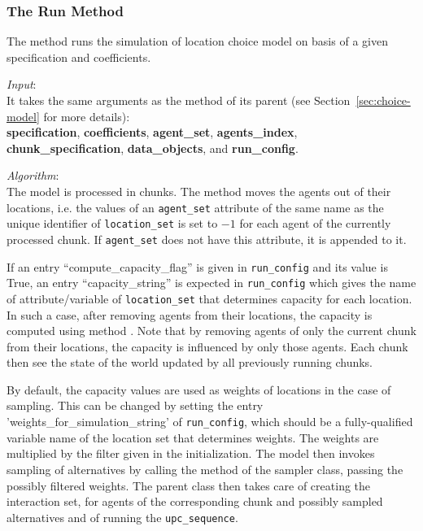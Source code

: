 %
\subsubsection{The Run Method}
%
The  method runs the simulation of location choice model on basis
of a given specification and coefficients.

{\it Input}:\\[1mm]
It takes the same arguments as the  method of its parent (see
Section~\ref{sec:choice-model} for more details): \\
{\bf specification}, {\bf coefficients}, {\bf agent_set}, {\bf agents_index},
{\bf chunk_specification}, {\bf data_objects}, and {\bf run_config}.

{\it Algorithm}:\\[1mm]
The model is processed in chunks. The  method moves
the agents out of their locations, i.e. the values of an
\verb|agent_set| attribute of the same name as the unique identifier of
\verb|location_set| is set to $-1$ for each agent of the currently processed
chunk. If \verb|agent_set| does not have this attribute, it is appended to it.

If an entry ``compute_capacity_flag'' is given in \verb|run_config| and its
value is True, an entry ``capacity_string'' is expected in \verb|run_config|
which gives the name of attribute/variable of \verb|location_set| that
determines capacity for each location. In such a case, after removing agents
from their locations, the capacity is computed using method
. Note that by removing agents of only the
current chunk from their locations, the capacity is influenced by only those
agents. Each chunk then see the state of the world updated by all previously
running chunks.

By default, the capacity values are used as weights of locations in the case of sampling.
This can be changed by setting the entry 'weights_for_simulation_string' of \verb|run_config|, 
which should be a fully-qualified variable name of the location set that determines weights. 
The weights are multiplied by the filter given in the initialization.  The
model then invokes sampling of alternatives by calling the
 method of the sampler class, passing the possibly filtered
weights. The parent class then takes care of creating the interaction set, for
agents of the corresponding chunk and possibly sampled alternatives and of
running the \verb|upc_sequence|. 

